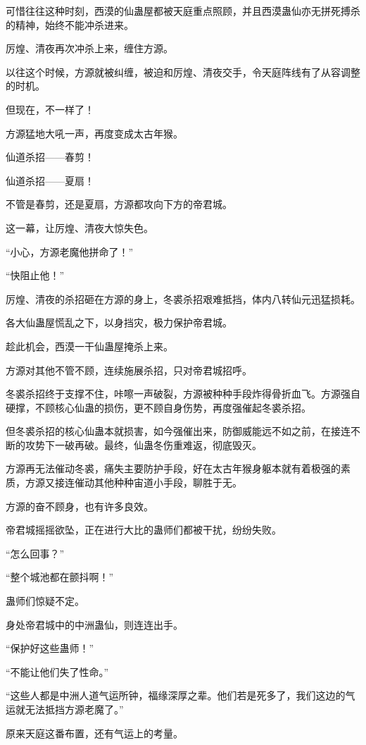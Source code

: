 \begin{this_body}
可惜往往这种时刻，西漠的仙蛊屋都被天庭重点照顾，并且西漠蛊仙亦无拼死搏杀的精神，始终不能冲杀进来。

厉煌、清夜再次冲杀上来，缠住方源。

以往这个时候，方源就被纠缠，被迫和厉煌、清夜交手，令天庭阵线有了从容调整的时机。

但现在，不一样了！

方源猛地大吼一声，再度变成太古年猴。

仙道杀招——春剪！

仙道杀招——夏扇！

不管是春剪，还是夏扇，方源都攻向下方的帝君城。

这一幕，让厉煌、清夜大惊失色。

“小心，方源老魔他拼命了！”

“快阻止他！”

厉煌、清夜的杀招砸在方源的身上，冬裘杀招艰难抵挡，体内八转仙元迅猛损耗。

各大仙蛊屋慌乱之下，以身挡灾，极力保护帝君城。

趁此机会，西漠一干仙蛊屋掩杀上来。

方源对其他不管不顾，连续施展杀招，只对帝君城招呼。

冬裘杀招终于支撑不住，咔嚓一声破裂，方源被种种手段炸得骨折血飞。方源强自硬撑，不顾核心仙蛊的损伤，更不顾自身伤势，再度强催起冬裘杀招。

但冬裘杀招的核心仙蛊本就损害，如今强催出来，防御威能远不如之前，在接连不断的攻势下一破再破。最终，仙蛊冬伤重难返，彻底毁灭。

方源再无法催动冬裘，痛失主要防护手段，好在太古年猴身躯本就有着极强的素质，方源又接连催动其他种种宙道小手段，聊胜于无。

方源的奋不顾身，也有许多良效。

帝君城摇摇欲坠，正在进行大比的蛊师们都被干扰，纷纷失败。

“怎么回事？”

“整个城池都在颤抖啊！”

蛊师们惊疑不定。

身处帝君城中的中洲蛊仙，则连连出手。

“保护好这些蛊师！”

“不能让他们失了性命。”

“这些人都是中洲人道气运所钟，福缘深厚之辈。他们若是死多了，我们这边的气运就无法抵挡方源老魔了。”

原来天庭这番布置，还有气运上的考量。


\end{this_body}
